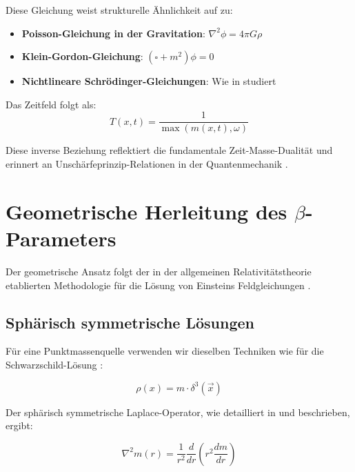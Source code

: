 \documentclass[12pt,a4paper]{article}
\newcommand{\vecx}{\vec{x}}
\begin{document}
	Diese Gleichung weist strukturelle Ähnlichkeit auf zu:
	\begin{itemize}
		\item \textbf{Poisson-Gleichung in der Gravitation}: $\nabla^2 \phi = 4\pi G \rho$ \citep{jackson1998}
		\item \textbf{Klein-Gordon-Gleichung}: $(\square + m^2)\phi = 0$ \citep{peskin1995}
		\item \textbf{Nichtlineare Schrödinger-Gleichungen}: Wie in \citep{sulem1999} studiert
	\end{itemize}
	
	Das Zeitfeld folgt als:
	\begin{equation}
		\label{eq:time_field_definition}
		T(x,t) = \frac{1}{\max(m(x,t), \omega)}
	\end{equation}
	
	Diese inverse Beziehung reflektiert die fundamentale Zeit-Masse-Dualität und erinnert an Unschärfeprinzip-Relationen in der Quantenmechanik \citep{heisenberg1927,griffiths2004}.
	
	\section{Geometrische Herleitung des $\beta$-Parameters}
	\label{sec:beta_derivation}
	
	Der geometrische Ansatz folgt der in der allgemeinen Relativitätstheorie etablierten Methodologie für die Lösung von Einsteins Feldgleichungen \citep{schwarzschild1916,misner1973,carroll2004}.
	
	\subsection{Sphärisch symmetrische Lösungen}
	\label{subsec:spherical_solutions}
	
	Für eine Punktmassenquelle verwenden wir dieselben Techniken wie für die Schwarzschild-Lösung \citep{schwarzschild1916,weinberg1972}:
	
	\begin{equation}
		\rho(x) = m \cdot \delta^3(\vecx)
	\end{equation}
	
	Der sphärisch symmetrische Laplace-Operator, wie detailliert in \citet{jackson1998} und \citet{griffiths1999} beschrieben, ergibt:
	
	\begin{equation}
		\nabla^2 m(r) = \frac{1}{r^2}\frac{d}{dr}\left(r^2 \frac{dm}{dr}\right)
	\end{equation}
	
\end{document}
